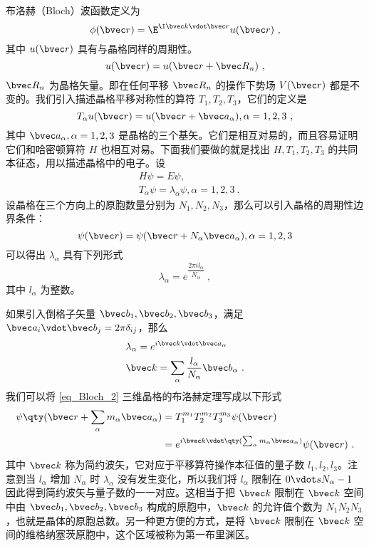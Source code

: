 \cite{黄昆}\cite{Bransden}布洛赫（Bloch）波函数定义为
\begin{equation}\label{eq_Bloch_3}
\phi(\bvec r) = \E^{\I \bvec k \vdot \bvec r} u(\bvec r)~,
\end{equation}
其中 $u(\bvec r)$ 具有与晶格同样的周期性。
\begin{equation}
u(\bvec r)=u(\bvec r+\bvec R_n)~,
\end{equation}
$\bvec R_n$ 为晶格矢量。即在任何平移 $\bvec R_n$ 的操作下势场 $V(\bvec r)$ 都是不变的。我们引入描述晶格平移对称性的算符 $T_1,T_2,T_3$，它们的定义是
\begin{equation}
T_\alpha u(\bvec r)= u(\bvec r+\bvec a_\alpha),\alpha=1,2,3~,
\end{equation}
其中 $\bvec a_\alpha,\alpha=1,2,3$ 是晶格的三个基矢。它们是相互对易的，而且容易证明它们和哈密顿算符 $H$ 也相互对易。下面我们要做的就是找出 $H,T_1,T_2,T_3$ 的共同本征态，用以描述晶格中的电子。设
\begin{equation}
\begin{aligned}
&H\psi=E\psi,\\
&T_\alpha \psi = \lambda_\alpha \psi, \alpha=1,2,3~.
\end{aligned}
\end{equation}
设晶格在三个方向上的原胞数量分别为 $N_1,N_2,N_3$，那么可以引入晶格的周期性边界条件：
\begin{equation}
\psi(\bvec r)=\psi(\bvec r+N_\alpha \bvec a_\alpha),\alpha=1,2,3
\end{equation}
可以得出 $\lambda_\alpha$ 具有下列形式
\begin{equation}
\lambda_\alpha=e^{ \dfrac{2\pi i l_\alpha}{N_\alpha}}~,
\end{equation}
其中 $l_\alpha$ 为整数。

如果引入倒格子矢量 $\bvec b_1,\bvec b_2,\bvec b_3$，满足 $\bvec a_i \vdot  \bvec b_j = 2\pi \delta_{ij}$，那么
\begin{equation}
\begin{aligned}
&\lambda_\alpha = e^{i \bvec k \vdot  \bvec a_\alpha}\\
&\bvec k=\sum_\alpha\frac{l_\alpha}{N_\alpha} \bvec b_\alpha~.
\end{aligned}
\end{equation}
我们可以将 \autoref{eq_Bloch_2} 三维晶格的布洛赫定理写成以下形式
\begin{equation}
\begin{aligned}
\psi\qty(\bvec r+\sum_\alpha m_\alpha\bvec a_\alpha) &= T_1^{m_1} T_2^{m_2} T_3^{m_3} \psi(\bvec r)\\
&=e^{i\bvec k\vdot  \qty(\sum_\alpha m_\alpha\bvec a_\alpha)}\psi(\bvec r)~.
\end{aligned}
\end{equation}
其中 $\bvec k$ 称为简约波矢，它对应于平移算符操作本征值的量子数 $l_1,l_2,l_3$。注意到当 $l_\alpha$ 增加 $N_\alpha$ 时 $\lambda_\alpha$ 没有发生变化，所以我们将 $l_\alpha$ 限制在 $0\vdot s N_\alpha-1$ 因此得到简约波矢与量子数的一一对应。这相当于把 $\bvec k$ 限制在 $\bvec k$ 空间中由 $\bvec b_1,\bvec b_2,\bvec b_3$ 构成的原胞中，$\bvec k$ 的允许值个数为 $N_1N_2N_3$，也就是晶体的原胞总数。另一种更方便的方式，是将 $\bvec k$ 限制在 $\bvec k$ 空间的维格纳塞茨原胞中，这个区域被称为第一布里渊区。